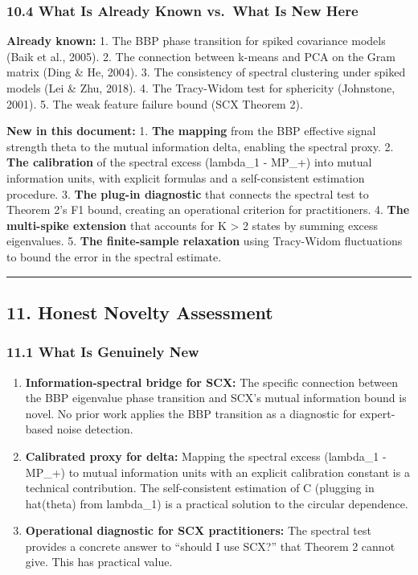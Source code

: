 \documentclass[
  12pt,
]{article}
\begin{document}
\subsubsection{10.4 What Is Already Known vs.~What Is New
Here}\label{what-is-already-known-vs.-what-is-new-here}

\textbf{Already known:} 1. The BBP phase transition for spiked
covariance models (Baik et al., 2005). 2. The connection between k-means
and PCA on the Gram matrix (Ding \& He, 2004). 3. The consistency of
spectral clustering under spiked models (Lei \& Zhu, 2018). 4. The
Tracy-Widom test for sphericity (Johnstone, 2001). 5. The weak feature
failure bound (SCX Theorem 2).

\textbf{New in this document:} 1. \textbf{The mapping} from the BBP
effective signal strength theta to the mutual information delta,
enabling the spectral proxy. 2. \textbf{The calibration} of the spectral
excess (lambda\_1 - MP\_+) into mutual information units, with explicit
formulas and a self-consistent estimation procedure. 3. \textbf{The
plug-in diagnostic} that connects the spectral test to Theorem 2's F1
bound, creating an operational criterion for practitioners. 4.
\textbf{The multi-spike extension} that accounts for K \textgreater{} 2
states by summing excess eigenvalues. 5. \textbf{The finite-sample
relaxation} using Tracy-Widom fluctuations to bound the error in the
spectral estimate.

\begin{center}\rule{0.5\linewidth}{0.5pt}\end{center}

\subsection{11. Honest Novelty
Assessment}\label{honest-novelty-assessment}

\subsubsection{11.1 What Is Genuinely New}\label{what-is-genuinely-new}

\begin{enumerate}
\def\labelenumi{\arabic{enumi}.}
\item
  \textbf{Information-spectral bridge for SCX:} The specific connection
  between the BBP eigenvalue phase transition and SCX's mutual
  information bound is novel. No prior work applies the BBP transition
  as a diagnostic for expert-based noise detection.
\item
  \textbf{Calibrated proxy for delta:} Mapping the spectral excess
  (lambda\_1 - MP\_+) to mutual information units with an explicit
  calibration constant is a technical contribution. The self-consistent
  estimation of C (plugging in hat(theta) from lambda\_1) is a practical
  solution to the circular dependence.
\item
  \textbf{Operational diagnostic for SCX practitioners:} The spectral
  test provides a concrete answer to ``should I use SCX?'' that Theorem
  2 cannot give. This has practical value.
\end{enumerate}
\end{document}
